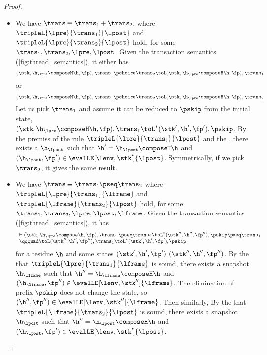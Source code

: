 \begin{proof}
\begin{itemize}
\item {}
We have  \(\trans \equiv \trans_{1} + \trans_{2} \), where \( \tripleL{\lpre}{\trans_{1}}{\lpost} \) and \( \tripleL{\lpre}{\trans_{2}}{\lpost} \) hold, for some \( \trans_{1}, \trans_{2}, \lpre, \lpost \).
Given the transaction semantics (\cref{fig:thread_semantics}), it either has 
\[ 
( \stk, \h_\lpre \composeH \h, \fp ), \trans_{1} \pchoice \trans_{2} \toL ( \stk, \h_\lpre \composeH \h, \fp ), \trans_{1} 
\]
or  
\[ 
( \stk, \h_\lpre \composeH \h, \fp ), \trans_{1} \pchoice \trans_{2} \toL ( \stk, \h_\lpre \composeH \h, \fp ), \trans_{2} 
\]
Let us pick \( \trans_{1} \) and  assume it can be reduced to \( \pskip \) from the initial state, \ie \( ( \stk, \h_\lpre \composeH \h, \fp ), \trans_{1}  \toL^{*} ( \stk', \h', \fp' ), \pskip \).
By the premiss of the rule \( \tripleL{\lpre}{\trans_{1}}{\lpost} \) and the \ih, 
there exists a \( \h_\lpost \) such that \( \h' = \h_\lpost \composeH \h \) and  \( (\h_\lpost, \fp') \in \evalLE[\lenv, \stk']{\lpost} \).
Symmetrically, if we pick \( \trans_{2} \), it gives the same result.

\item {}
We have \( \trans \equiv \trans_{1} \pseq \trans_{2} \) where \( \tripleL{\lpre}{\trans_{1}}{\lframe} \) and \( \tripleL{\lframe}{\trans_{2}}{\lpost} \) hold, for some \( \trans_{1}, \trans_{2}, \lpre, \lpost, \lframe \).
Given the transaction semantics (\cref{fig:thread_semantics}), 
it has 
\[
    \begin{array}{l}
    \vdash ( \stk, \h_\lpre \compose \h, \fp ), \trans_{1} \pseq \trans_{2} \toL^{*} ( \stk'', \h'', \fp'' ), \pskip \pseq \trans_{1} \\
    \qqquad \toL ( \stk'', \h'', \fp'' ), \trans_{1} \toL^{*} ( \stk', \h', \fp' ), \pskip 
\end{array}
\] 
for a residue \( \h \) and  some states \( (\stk', \h', \fp'), (\stk'', \h'', \fp'') \).
By the \ih that \( \tripleL{\lpre}{\trans_{1}}{\lframe} \) is sound,
there exists a snapshot \( \h_\lframe \) such that \( \h'' = \h_\lframe \composeH \h \) and \( (\h_\lframe, \fp'') \in \evalLE[\lenv, \stk'']{\lframe} \).
The elimination of prefix \( \pskip \) does not change the state, so \( (\h'', \fp'') \in \evalLE[\lenv, \stk'']{\lframe} \).
Then similarly, 
By the \ih that \( \tripleL{\lframe}{\trans_{2}}{\lpost} \) is sound,
there exists a snapshot \( \h_\lpost \) such that \( \h'' = \h_\lpost \composeH \h \) and \( (\h_\lpost, \fp') \in \evalLE[\lenv, \stk']{\lpost} \).


\end{itemize}
\end{proof}
